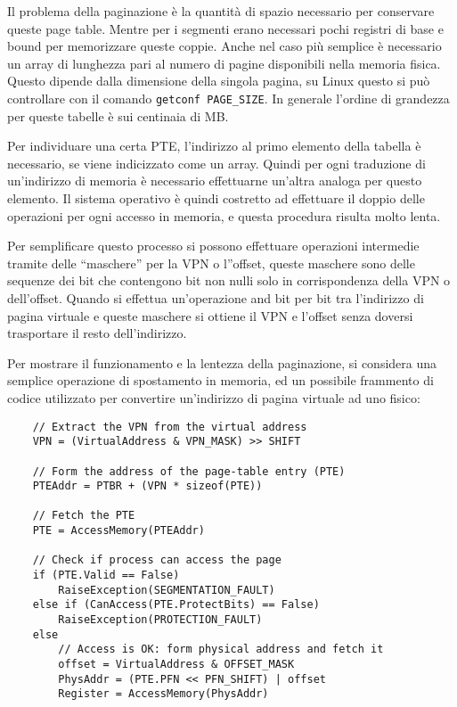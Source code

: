 \documentclass{article}
\numberwithin{equation}{subsection}
\begin{document}

Il problema della paginazione è la quantità di spazio necessario per conservare queste page table. Mentre per i segmenti erano necessari pochi registri di base e bound 
per memorizzare queste coppie. Anche nel caso più semplice è necessario un array di lunghezza pari al numero di pagine disponibili nella memoria fisica. 
Questo dipende dalla dimensione della singola pagina, su Linux questo si può controllare con il comando \verb|getconf PAGE_SIZE|. In generale l'ordine di grandezza per 
queste tabelle è sui centinaia di MB. 

Per individuare una certa PTE, l'indirizzo al primo elemento della tabella è necessario, se viene indicizzato come un array. Quindi per ogni traduzione di un'indirizzo di 
memoria è necessario effettuarne un'altra analoga per questo elemento. Il sistema operativo è quindi costretto ad effettuare il doppio delle operazioni per ogni 
accesso in memoria, e questa procedura risulta molto lenta. 

Per semplificare questo processo si possono effettuare operazioni intermedie tramite delle ``maschere'' per la VPN o l''offset, queste maschere sono delle sequenze dei 
bit che contengono bit non nulli solo in corrispondenza della VPN o dell'offset. Quando si effettua un'operazione and bit per bit tra l'indirizzo di pagina virtuale 
e queste maschere si ottiene il VPN e l'offset senza doversi trasportare il resto dell'indirizzo. 


Per mostrare il funzionamento e la lentezza della paginazione, si considera una semplice operazione di spostamento in memoria, 
ed un possibile frammento di codice utilizzato per convertire un'indirizzo di pagina virtuale ad uno fisico:
\begin{verbatim}
    // Extract the VPN from the virtual address
    VPN = (VirtualAddress & VPN_MASK) >> SHIFT

    // Form the address of the page-table entry (PTE)
    PTEAddr = PTBR + (VPN * sizeof(PTE))

    // Fetch the PTE
    PTE = AccessMemory(PTEAddr)

    // Check if process can access the page
    if (PTE.Valid == False)
        RaiseException(SEGMENTATION_FAULT)
    else if (CanAccess(PTE.ProtectBits) == False)
        RaiseException(PROTECTION_FAULT)
    else
        // Access is OK: form physical address and fetch it
        offset = VirtualAddress & OFFSET_MASK
        PhysAddr = (PTE.PFN << PFN_SHIFT) | offset
        Register = AccessMemory(PhysAddr)
\end{verbatim}
\end{document}
